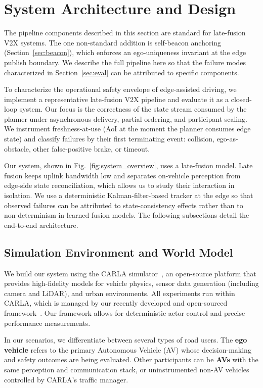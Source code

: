 \section{System Architecture and Design}
\label{sec:architecture}

The pipeline components described in this section are standard for late-fusion V2X systems. The one non-standard addition is self-beacon anchoring (Section~\ref{sec:beacon}), which enforces an ego-uniqueness invariant at the edge publish boundary. We describe the full pipeline here so that the failure modes characterized in Section~\ref{sec:eval} can be attributed to specific components.

To characterize the operational safety envelope of edge-assisted driving, we implement a representative late-fusion V2X pipeline and evaluate it as a closed-loop system. Our focus is the correctness of the state stream consumed by the planner under asynchronous delivery, partial ordering, and participant scaling. We instrument freshness-at-use (AoI at the moment the planner consumes edge state) and classify failures by their first terminating event: collision, ego-as-obstacle, other false-positive brake, or timeout.

Our system, shown in Fig.~\ref{fig:system_overview}, uses a late-fusion model. Late fusion keeps uplink bandwidth low and separates on-vehicle perception from edge-side state reconciliation, which allows us to study their interaction in isolation. We use a deterministic Kalman-filter-based tracker at the edge so that observed failures can be attributed to state-consistency effects rather than to non-determinism in learned fusion models. The following subsections detail the end-to-end architecture.

\subsection{Simulation Environment and World Model}
We build our system using the CARLA simulator~\cite{dosovitskiy_carla_nodate}, an open-source platform that provides high-fidelity models for vehicle physics, sensor data generation (including camera and LiDAR), and urban environments. All experiments run within CARLA, which is managed by our recently developed and open-sourced \ecav 
framework~\cite{eCAV}. Our framework allows for deterministic actor control and precise performance measurements.

In our scenarios, we differentiate between several types of road users. The \textbf{ego vehicle} refers to the primary Autonomous Vehicle (AV) whose decision-making and safety outcomes are being evaluated. Other participants can be \textbf{AVs} with the same perception and communication stack, or uninstrumented non-AV vehicles controlled by CARLA's traffic manager.

